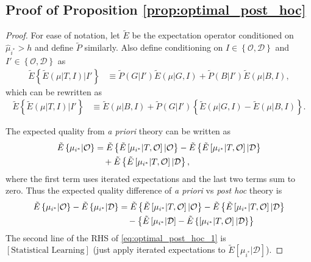 \documentclass[12pt,english]{article}
\theoremstyle{plain}
\theoremstyle{plain}
\begin{document}
\begin{appendices}
\section{Proof of Proposition \ref{prop:optimal_post_hoc}}\label{sec:app:proof1}
\begin{proof}
    For ease of notation, let $\tilde{E}$ be the expectation operator conditioned on $\hat{\mu}_{i^{\ast}}>h$ and define $\tilde{P}$ similarly. Also define conditioning on $I\in \left\{ \mathcal{O},\mathcal{D}\right\}$ and $I'\in \left\{ \mathcal{O},\mathcal{D}\right\}$ as
    \begin{align}
        \tilde{E}\left\{ \tilde{E}\left(\mu|T,I\right)|I'\right\} 
            &\equiv \tilde{P}\left(G|I'\right)\tilde{E}\left(\mu|G,I\right)+\tilde{P}\left(B|I'\right)\tilde{E}\left(\mu|B,I\right),
    \end{align}
    which can be rewritten as
    \begin{align}\label{eq:app-proof-2}
        \tilde{E}\left\{ \tilde{E}\left(\mu|T,I\right)|I'\right\} 
            &\equiv \tilde{E}\left(\mu|B,I\right) 
            + \tilde{P}\left(G|I'\right)
            \left\{ \tilde{E}\left(\mu|G,I\right)-\tilde{E}\left(\mu|B,I\right)\right\}. 
    \end{align}

    The expected quality from \emph{a priori} theory can be written as
    \begin{align}
    \tilde{E}\left\{ \mu_{i^{\ast}}|\mathcal{O}\right\} 	
    &= \tilde{E}\left\{ \tilde{E}\left[\mu_{i^{\ast}}|T,\mathcal{O}\right]|\mathcal{O}\right\} 
    - \tilde{E}\left\{ 
        \tilde{E}\left[\mu_{i^{\ast}}|T,\mathcal{O}\right]|\mathcal{D}
    \right\} \notag \\
    &\quad + \tilde{E}\left\{ \tilde{E}\left[\mu_{i^{\ast}}|T,\mathcal{O}\right]|\mathcal{D}\right\}, 
    \end{align}  
    where the first term uses iterated expectations and the last two terms sum to zero. Thus the expected quality difference of \emph{a priori} vs \emph{post hoc} theory is
    \begin{align}
        \tilde{E}\left\{ \mu_{i^{\ast}}|\mathcal{O}\right\} -\tilde{E}\left\{ \mu_{i^{\ast}}|\mathcal{D}\right\} 	
            &=\tilde{E}\left\{ \tilde{E}\left[\mu_{i^{\ast}}|T,\mathcal{O}\right]|\mathcal{O}\right\} -\tilde{E}\left\{ \tilde{E}\left[\mu_{i^{\ast}}|T,\mathcal{O}\right]|\mathcal{D}\right\} \notag \\
            &\quad-\left\{
                \tilde{E}\left[\mu_{i^{\ast}}|\mathcal{D}\right]
                -\tilde{E}\left\{\left[\mu_{i^{\ast}}|T,\mathcal{O}\right]|\mathcal{D}\right\}
            \right\}
            \label{eq:optimal_post_hoc_1}
    \end{align}
    The second line of the RHS of \eqref{eq:optimal_post_hoc_1} is $\left[\text{Statistical Learning}\right]$ (just apply iterated expectations to $\tilde{E}\left[\mu_{i^{\ast}}|\mathcal{D}\right]$).


\end{proof}
\end{appendices}
\end{document}
